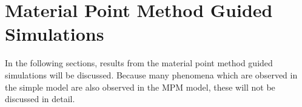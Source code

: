 \section{Material Point Method Guided Simulations}
\label{sec:mpm_disc}

In the following sections, results from the material point method guided simulations will be discussed. Because many phenomena which are observed in the simple model are also observed in the MPM model, these will not be discussed in detail. \par

